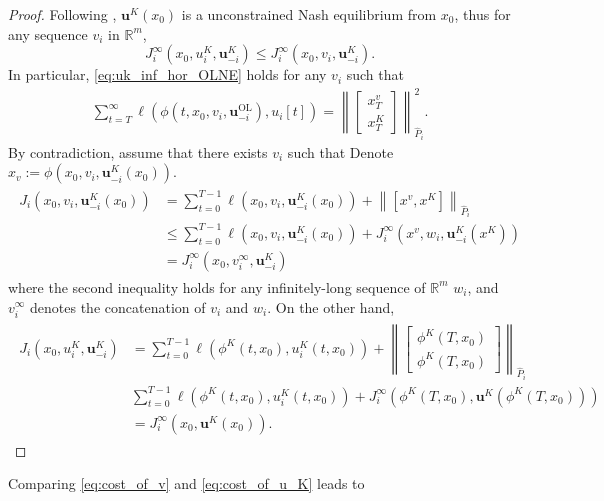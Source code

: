 \documentclass[letterpaper, 10 pt, conference]{ieeeconf}  %
\newcommand{\R}{\mathbb{R}}
\newcommand{\buol}{\boldsymbol{u}^{\mathrm{OL}}}
\newcommand{\bu}{\boldsymbol{u}}
\newcommand{\tsum}{\textstyle\sum}
\begin{document}
\begin{proof}
    Following \cite[Prop. 1]{benenati2024linear}, $\bu^K(x_0)$ is a unconstrained Nash equilibrium from $x_0$, thus for any sequence $v_i$ in $\R^m$,
    \begin{equation} \label{eq:uk_inf_hor_OLNE}
        J_i^{\infty} (x_0,  u_i^K, \bu_{-i}^K) \leq J_i^\infty (x_0, v_i, \bu^K_{-i}).
    \end{equation} In particular, \eqref{eq:uk_inf_hor_OLNE} holds for any $v_i$ such that 
    \begin{align}
        \sum_{t=T}^\infty \ell(\phi(t, x_0, v_i, \buol_{-i}), {u}_i[t]) = \left\|\begin{bmatrix}
            x_T^v \\ x_T^K 
        \end{bmatrix}\right\|^2_{\hat{P}_i}.
    \end{align}
    By contradiction, assume that there exists $v_i$ such that 
    Denote $x_v:= \phi(x_0,v_i, \bu^K_{-i}(x_0))$.
    \begin{align}\label{eq:cost_of_v}
        \begin{split}
            J_i(x_0, v_i, \bu^K_{-i}(x_0)) &= \tsum_{t=0}^{T-1} \ell(x_0, v_i, \bu^K_{-i}(x_0)) + \left\|[x^v, x^K] \right\|_{\hat{P}_i}\\
            & \leq \tsum_{t=0}^{T-1} \ell(x_0, v_i, \bu^K_{-i}(x_0)) + J_i^\infty(x^v, w_i, \bu^K_{-i}(x^K)) \\
            & = J_i^\infty(x_0, v_i^\infty, \bu^K_{-i})
        \end{split}
    \end{align}
    where the second inequality holds for any infinitely-long sequence of $\R^m$ $w_i$, and $v_i^\infty$ denotes the concatenation of $v_i$ and $w_i$. On the other hand,
    \begin{align}\label{eq:cost_of_u_K}
    \begin{split}
        J_i(x_0, u^K_i, \bu^K_{-i}) & = \sum_{t=0}^{T-1} \ell (\phi^K(t,x_0), u_i^K(t,x_0)) + \left\|\begin{bmatrix}
            \phi^K(T,x_0) \\ \phi^K(T,x_0)
        \end{bmatrix} \right\|_{\hat{P}_i} \\
        & \sum_{t=0}^{T-1} \ell (\phi^K(t,x_0), u_i^K(t,x_0)) + J_i^\infty(\phi^K(T,x_0), \bu^K(\phi^K(T,x_0))) \\
        & = J_i^\infty(x_0, \bu^K(x_0)).
    \end{split}
    \end{align}
\end{proof}
Comparing \eqref{eq:cost_of_v} and \eqref{eq:cost_of_u_K} leads to 
\begin{equation}
    
\end{equation}
\end{document}
